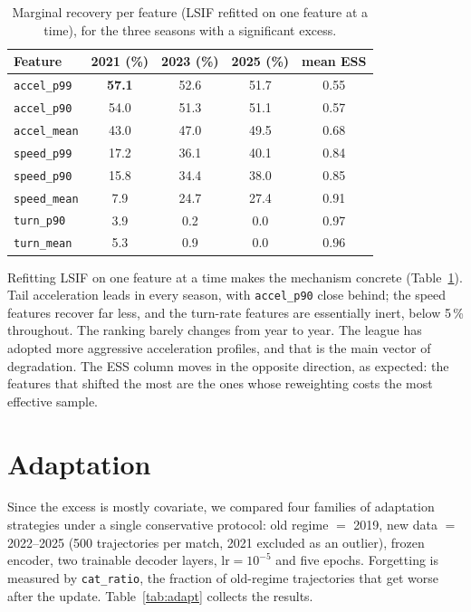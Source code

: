 \documentclass[runningheads]{llncs}
\begin{document}
\begin{table}[t]
\centering
\caption{Marginal recovery per feature (LSIF refitted on one feature at a
time), for the three seasons with a significant excess.}
\label{tab:iwfeat}
\small
\begin{tabular}{lcccc}
\toprule
\textbf{Feature} & \textbf{2021 (\%)} & \textbf{2023 (\%)} & \textbf{2025 (\%)}
 & \textbf{mean ESS} \\
\midrule
\texttt{accel\_p99}  & \textbf{57.1} & 52.6 & 51.7 & 0.55 \\
\texttt{accel\_p90}  & 54.0          & 51.3 & 51.1 & 0.57 \\
\texttt{accel\_mean} & 43.0          & 47.0 & 49.5 & 0.68 \\
\texttt{speed\_p99}  & 17.2          & 36.1 & 40.1 & 0.84 \\
\texttt{speed\_p90}  & 15.8          & 34.4 & 38.0 & 0.85 \\
\texttt{speed\_mean} &  7.9          & 24.7 & 27.4 & 0.91 \\
\texttt{turn\_p90}   &  3.9          &  0.2 &  0.0 & 0.97 \\
\texttt{turn\_mean}  &  5.3          &  0.9 &  0.0 & 0.96 \\
\bottomrule
\end{tabular}
\end{table}

Refitting LSIF on one feature at a time makes the mechanism concrete
(Table~\ref{tab:iwfeat}). Tail acceleration leads in every season, with
\texttt{accel\_p90} close behind; the speed features recover far less, and the
turn-rate features are essentially inert, below 5\,\% throughout. The ranking
barely changes from year to year. The league has adopted more aggressive
acceleration profiles, and that is the main vector of degradation. The ESS
column moves in the opposite direction, as expected: the features that shifted
the most are the ones whose reweighting costs the most effective sample.

\section{Adaptation}
\label{sec:adaptation}

Since the excess is mostly covariate, we compared four families of adaptation
strategies under a single conservative protocol: old regime $=$ 2019, new data
$=$ 2022--2025 (500 trajectories per match, 2021 excluded as an outlier),
frozen encoder, two trainable decoder layers, $\mathrm{lr} = 10^{-5}$ and five
epochs. Forgetting is measured by \texttt{cat\_ratio}, the fraction of old-regime
trajectories that get worse after the update. Table~\ref{tab:adapt} collects
the results.
\end{document}
